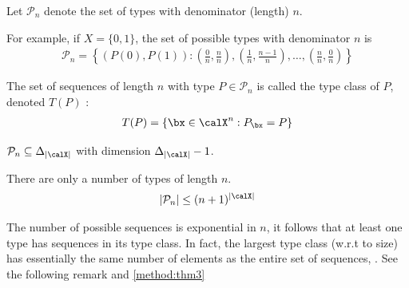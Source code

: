 \documentclass{article}
\newcommand{\typss}{\mathcal{P}_n}
\begin{document}
\begin{defa}{}\label{method:defP}
Let $\mathcal{P}_{n}$ denote the set of types with denominator  (length) $n$.
\end{defa}

For example, if $X =\{0,1\}$, the set of possible types with denominator $n$ is
\begin{align*}
\typss=\left\{(P(0), P(1)):\left(\frac{0}{n}, \frac{n}{n}\right),\left(\frac{1}{n}, \frac{n-1}{n}\right), \ldots,\left(\frac{n}{n}, \frac{0}{n}\right)\right\}
\end{align*}

\begin{defa}{}
The set of sequences of length $n$ with type $P\in \typss$  is called the type class of $P$, denoted $T(P)$ :
\begin{align*}
T(P)=\left\{ \bx \in \calX ^{n}: P_{ \bx }=P\right\}
\end{align*}
\end{defa}

\begin{rema}
$\typss\subseteq \Delta_{|\calX|}$ with dimension $\Delta_{|\calX|}-1$.
\end{rema}

\begin{thma} {}\label{method:thm1}
There are only a  number of types of length $n$.
\begin{align*}
\left| \typss\right| \leq(n+1)^{| \calX |}
\end{align*}
\end{thma}

\begin{rema}\label{method:rem1}
The number of possible sequences is exponential in $n$, it follows that at least one type has  sequences in its type class. 
In fact, the largest type class (w.r.t to size) has essentially the same number of elements as the entire set of sequences, . See the following remark and \cref{method:thm3}




\end{rema}
\end{document}
